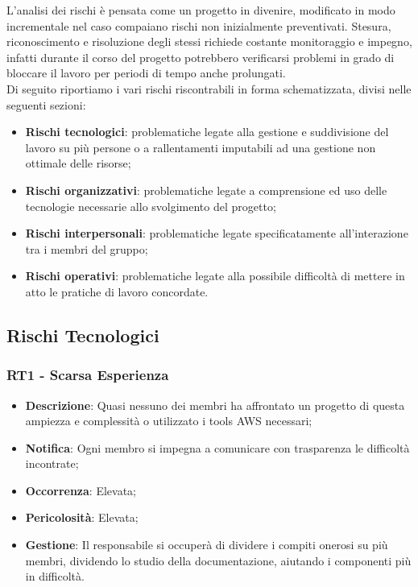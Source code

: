 L'analisi dei rischi è pensata come un progetto in divenire, modificato in modo incrementale nel caso compaiano rischi non inizialmente preventivati. Stesura, riconoscimento e risoluzione degli stessi richiede costante monitoraggio e impegno, infatti durante il corso del progetto potrebbero verificarsi problemi in grado di bloccare il lavoro per periodi di tempo anche prolungati. \\
 Di seguito riportiamo i vari rischi riscontrabili in forma schematizzata, divisi nelle seguenti sezioni:
\begin{itemize}
   \item \textbf{Rischi tecnologici}: problematiche legate alla gestione e suddivisione del lavoro su più persone o a rallentamenti imputabili ad una gestione non ottimale delle risorse;
   \item \textbf{Rischi organizzativi}: problematiche legate a comprensione ed uso delle tecnologie necessarie allo svolgimento del progetto;
   \item \textbf{Rischi interpersonali}: problematiche legate specificatamente all'interazione tra i membri del gruppo;
   \item \textbf{Rischi operativi}: problematiche legate alla possibile difficoltà di mettere in atto le pratiche di lavoro concordate.
\end{itemize}

   \subsection{Rischi Tecnologici}
   
   \subsubsection*{RT1 - Scarsa Esperienza}
   \begin{itemize}
   	\item \textbf{Descrizione}: Quasi nessuno dei membri ha affrontato un progetto di questa ampiezza e complessità o utilizzato i tools AWS necessari;
   	\item \textbf{Notifica}: Ogni membro si impegna a comunicare con trasparenza le difficoltà incontrate;
   	\item \textbf{Occorrenza}: Elevata;
   	\item \textbf{Pericolosità}: Elevata;
   	\item \textbf{Gestione}: Il responsabile si occuperà di dividere i compiti onerosi su più membri, dividendo lo studio della documentazione, aiutando i componenti più in difficoltà.
   \end{itemize}

